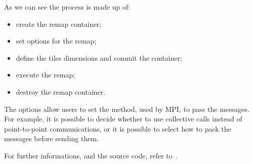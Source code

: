 As we can see the process is made up of:
\begin{itemize}
\item create the remap container;
\item set options for the remap;
\item define the tiles dimensions and commit the container;
\item execute the remap;
\item destroy the remap container.
\end{itemize}
\par
The options allow users to set the method, used by MPI, to pass the messages. For example, it is possible to decide whether to use collective calls instead of point-to-point communications, or it is possible to select how to pack the messages before sending them.
\par
For further informations, and the source code, refer to~\cite{fftMPI}.


